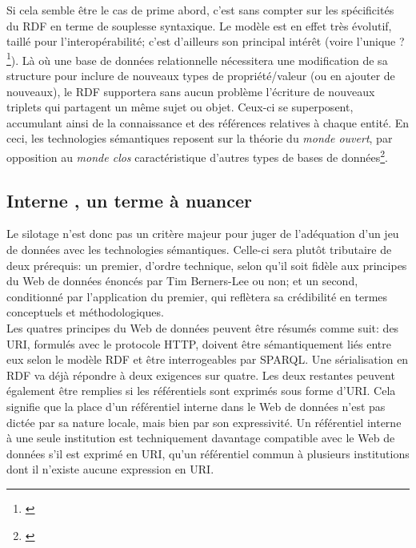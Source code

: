 \documentclass[a4paper,12pt,twoside]{book}
\begin{document}
Si cela semble être le cas de prime abord, c'est sans compter sur les spécificités du RDF en terme de souplesse syntaxique. Le modèle est en effet très évolutif, taillé pour l'interopérabilité; c'est d'ailleurs son principal intérêt (voire l'\og unique ?\fg\footnote{\cite{poupeauReflexionsQuestionsAutour2018}}). Là où une base de données relationnelle nécessitera une modification de sa structure pour inclure de nouveaux types de propriété/valeur (ou en ajouter de nouveaux), le RDF supportera sans aucun problème l'écriture de nouveaux triplets qui partagent un même sujet ou objet. Ceux-ci se superposent, accumulant ainsi de la connaissance et des références relatives à chaque entité. En ceci, les technologies sémantiques reposent sur la théorie du \textit{monde ouvert}, par opposition au \textit{monde clos} caractéristique d'autres types de bases de données\footnote{\cite{bohnkeVousModelisezMonde2019}}.\\


\subsection{\og Interne \fg, un terme à nuancer}

Le silotage n'est donc pas un critère majeur pour juger de l'adéquation d'un jeu de données avec les technologies sémantiques. Celle-ci sera plutôt tributaire de deux prérequis: un premier, d'ordre technique, selon qu'il soit fidèle aux principes du Web de données énoncés par Tim Berners-Lee ou non; et un second, conditionné par l'application du premier, qui reflètera sa crédibilité en termes conceptuels et méthodologiques.\\

Les quatres principes du Web de données peuvent être résumés comme suit: des URI, formulés avec le protocole HTTP, doivent être sémantiquement liés entre eux selon le modèle RDF et être interrogeables par SPARQL. Une sérialisation en RDF va déjà répondre à deux exigences sur quatre. Les deux restantes peuvent également être remplies si les référentiels sont exprimés sous forme d'URI. Cela signifie que la place d'un référentiel interne dans le Web de données n'est pas dictée par sa nature locale, mais bien par son expressivité. Un référentiel interne à une seule institution est techniquement davantage compatible avec le Web de données s'il est exprimé en URI, qu'un référentiel commun à plusieurs institutions dont il n'existe aucune expression en URI.\\
\end{document}

